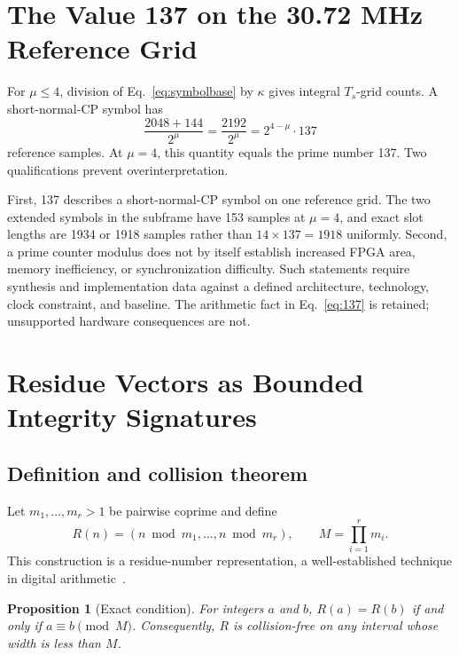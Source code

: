 \documentclass[11pt]{article}
\newtheorem{proposition}{Proposition}
\begin{document}
\section{The Value 137 on the 30.72 MHz Reference Grid}

For $\mu\leq4$, division of Eq.~\eqref{eq:symbolbase} by $\kappa$ gives integral $T_s$-grid counts.  A short-normal-CP symbol has
\begin{equation}
    \frac{2048+144}{2^\mu}=\frac{2192}{2^\mu}=2^{4-\mu}\cdot137
    \label{eq:137}
\end{equation}
reference samples.  At $\mu=4$, this quantity equals the prime number 137.  Two qualifications prevent overinterpretation.

First, 137 describes a short-normal-CP symbol on one reference grid.  The two extended symbols in the subframe have 153 samples at $\mu=4$, and exact slot lengths are 1934 or 1918 samples rather than $14\times137=1918$ uniformly.  Second, a prime counter modulus does not by itself establish increased FPGA area, memory inefficiency, or synchronization difficulty.  Such statements require synthesis and implementation data against a defined architecture, technology, clock constraint, and baseline.  The arithmetic fact in Eq.~\eqref{eq:137} is retained; unsupported hardware consequences are not.

\section{Residue Vectors as Bounded Integrity Signatures}

\subsection{Definition and collision theorem}

Let $m_1,\ldots,m_r>1$ be pairwise coprime and define
\begin{equation}
    R(n)=(n\bmod m_1,\ldots,n\bmod m_r),
    \qquad M=\prod_{i=1}^r m_i.
    \label{eq:signature}
\end{equation}
This construction is a residue-number representation, a well-established technique in digital arithmetic~\cite{soderstrand1986}.

\begin{proposition}[Exact condition]
For integers $a$ and $b$, $R(a)=R(b)$ if and only if $a\equiv b\pmod M$.  Consequently, $R$ is collision-free on any interval whose width is less than $M$.
\end{proposition}
\end{document}
